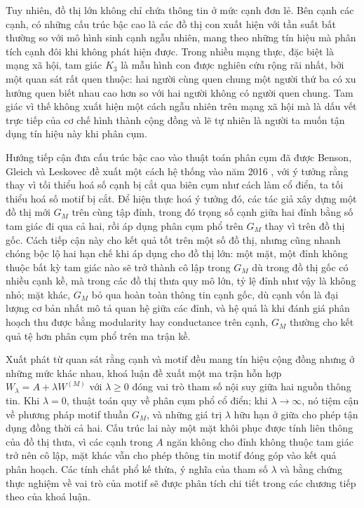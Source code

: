 Tuy nhiên, đồ thị lớn không chỉ chứa thông tin ở mức cạnh đơn lẻ. Bên cạnh các cạnh, có những cấu trúc bậc cao là các đồ thị con xuất hiện với tần suất bất thường so với mô hình sinh cạnh ngẫu nhiên, mang theo những tín hiệu mà phân tích cạnh đôi khi không phát hiện được. Trong nhiều mạng thực, đặc biệt là mạng xã hội, tam giác $K_3$ là mẫu hình con được nghiên cứu rộng rãi nhất, bởi một quan sát rất quen thuộc: hai người cùng quen chung một người thứ ba có xu hướng quen biết nhau cao hơn so với hai người không có người quen chung. Tam giác vì thế không xuất hiện một cách ngẫu nhiên trên mạng xã hội mà là dấu vết trực tiếp của cơ chế hình thành cộng đồng và lẽ tự nhiên là người ta muốn tận dụng tín hiệu này khi phân cụm.

Hướng tiếp cận đưa cấu trúc bậc cao vào thuật toán phân cụm đã được Benson, Gleich và Leskovec đề xuất một cách hệ thống vào năm 2016 \cite{benson2016}, với ý tưởng rằng thay vì tối thiểu hoá số cạnh bị cắt qua biên cụm như cách làm cổ điển, ta tối thiểu hoá số motif bị cắt. Để hiện thực hoá ý tưởng đó, các tác giả xây dựng một đồ thị mới $G_M$ trên cùng tập đỉnh, trong đó trọng số cạnh giữa hai đỉnh bằng số tam giác đi qua cả hai, rồi áp dụng phân cụm phổ trên $G_M$ thay vì trên đồ thị gốc. Cách tiếp cận này cho kết quả tốt trên một số đồ thị, nhưng cũng nhanh chóng bộc lộ hai hạn chế khi áp dụng cho đồ thị lớn: một mặt, một đỉnh không thuộc bất kỳ tam giác nào sẽ trở thành cô lập trong $G_M$ dù trong đồ thị gốc có nhiều cạnh kề, mà trong các đồ thị thưa quy mô lớn, tỷ lệ đỉnh như vậy là không nhỏ; mặt khác, $G_M$ bỏ qua hoàn toàn thông tin cạnh gốc, dù cạnh vốn là đại lượng cơ bản nhất mô tả quan hệ giữa các đỉnh, và hệ quả là khi đánh giá phân hoạch thu được bằng modularity hay conductance trên cạnh, $G_M$ thường cho kết quả tệ hơn phân cụm phổ trên ma trận kề.

Xuất phát từ quan sát rằng cạnh và motif đều mang tín hiệu cộng đồng nhưng ở những mức khác nhau, khoá luận đề xuất một ma trận hỗn hợp $W_\lambda = A + \lambda W^{(M)}$ với $\lambda \geq 0$ đóng vai trò tham số nội suy giữa hai nguồn thông tin. Khi $\lambda = 0$, thuật toán quy về phân cụm phổ cổ điển; khi $\lambda \to \infty$, nó tiệm cận về phương pháp motif thuần $G_M$, và những giá trị $\lambda$ hữu hạn ở giữa cho phép tận dụng đồng thời cả hai. Cấu trúc lai này một mặt khôi phục được tính liên thông của đồ thị thưa, vì các cạnh trong $A$ ngăn không cho đỉnh không thuộc tam giác trở nên cô lập, mặt khác vẫn cho phép thông tin motif đóng góp vào kết quả phân hoạch. Các tính chất phổ kế thừa, ý nghĩa của tham số $\lambda$ và bằng chứng thực nghiệm về vai trò của motif sẽ được phân tích chi tiết trong các chương tiếp theo của khoá luận.

